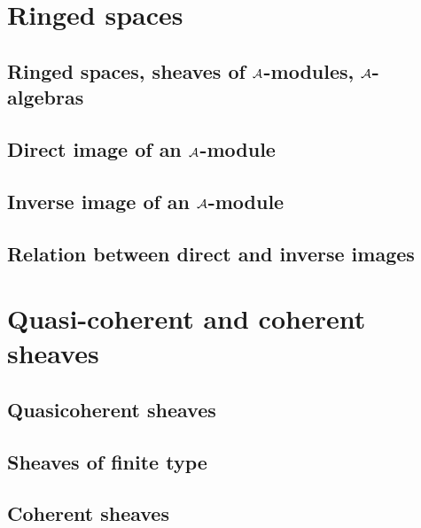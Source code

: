 \documentclass[10pt,oneside]{amsart}
\begin{document}
    \section{Ringed spaces}

        \subsection{Ringed spaces, sheaves of $\mathcal{A}$-modules, $\mathcal{A}$-algebras}
        

        \subsection{Direct image of an $\mathcal{A}$-module}
        

        \subsection{Inverse image of an $\mathcal{A}$-module}
        

        \subsection{Relation between direct and inverse images}
        

    \section{Quasi-coherent and coherent sheaves}

        \subsection{Quasicoherent sheaves}
        

        \subsection{Sheaves of finite type}
        

        \subsection{Coherent sheaves}
        
\end{document}
